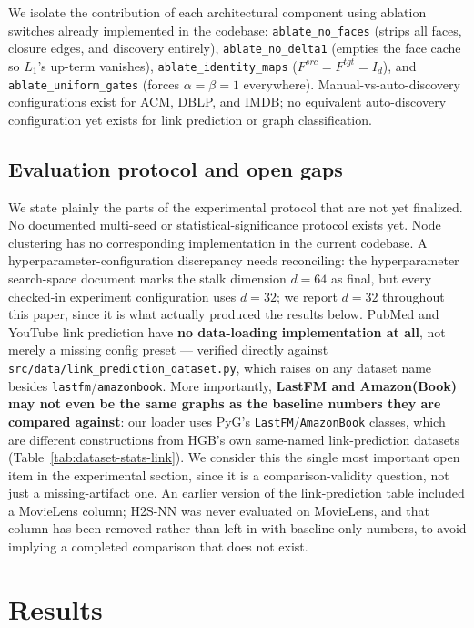 \documentclass{article}
\begin{document}
We isolate the contribution of each architectural component using ablation switches already
implemented in the codebase: \texttt{ablate\_no\_faces} (strips all faces, closure edges, and
discovery entirely), \texttt{ablate\_no\_delta1} (empties the face cache so $L_1$'s up-term
vanishes), \texttt{ablate\_identity\_maps} ($F^{src}=F^{tgt}=I_d$), and \texttt{ablate\_uniform\_gates}
(forces $\alpha=\beta=1$ everywhere). Manual-vs-auto-discovery configurations exist for ACM, DBLP,
and IMDB; no equivalent auto-discovery configuration yet exists for link prediction or graph
classification.

\subsection{Evaluation protocol and open gaps}
\label{sec:gaps}

We state plainly the parts of the experimental protocol that are not yet finalized. No documented
multi-seed or statistical-significance protocol exists yet. Node clustering has no corresponding
implementation in the current codebase. A hyperparameter-configuration discrepancy needs
reconciling: the hyperparameter search-space document marks the stalk dimension $d=64$ as final,
but every checked-in experiment configuration uses $d=32$; we report $d=32$ throughout this paper,
since it is what actually produced the results below. PubMed and YouTube link prediction have
\textbf{no data-loading implementation at all}, not merely a missing config preset --- verified
directly against \texttt{src/data/link\_prediction\_dataset.py}, which raises on any dataset name
besides \texttt{lastfm}/\texttt{amazonbook}. More importantly, \textbf{LastFM and Amazon(Book) may
not even be the same graphs as the baseline numbers they are compared against}: our loader uses
PyG's \texttt{LastFM}/\texttt{AmazonBook} classes, which are different constructions from HGB's own
same-named link-prediction datasets (Table~\ref{tab:dataset-stats-link}). We consider this the
single most important open item in the experimental section, since it is a comparison-validity
question, not just a missing-artifact one. An earlier version of the link-prediction table
included a MovieLens column; H2S-NN was never evaluated on MovieLens, and that column has been
removed rather than left in with baseline-only numbers, to avoid implying a completed comparison
that does not exist.

\section{Results}
\label{sec:results}
\end{document}
